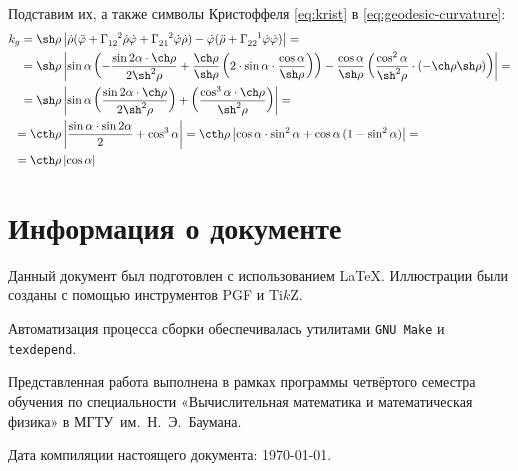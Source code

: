 \documentclass{article}
\numberwithin{equation}{section}
\renewcommand{\phi}{\varphi}
\newcommand{\krist}[3]{\Gamma^{\phantom{#1 #2}#3}_{#1 #2}}
\providecommand{\abs}[1]{\left \lvert{#1}\right \rvert}
\begin{document}
Подставим их, а также символы Кристоффеля \eqref{eq:krist} в
\eqref{eq:geodesic-curvature}:
\begin{equation*}\label{eq:con-geo-curvature}
  \begin{split}
    k_g = \sh\rho& \abs{\dot\rho(\ddot\phi +
      \krist{1}{2}{2}\dot\rho\dot\phi +
      \krist{2}{1}{2}\dot\phi\dot\rho) -
      \dot\phi(\ddot\rho + \krist{2}{2}{1}\dot\phi\dot\phi)} =\\
    =\sh\rho& \abs{\sin\alpha\left(-\frac{\sin{2\alpha} \cdot
          \ch\rho}{2\sh^2\rho} +
        \frac{\ch\rho}{\sh\rho}\left(2\cdot\sin\alpha\cdot\frac{\cos\alpha}{\sh\rho}\right)\right)
      - \frac{\cos\alpha}{\sh\rho}
      \left(\frac{\cos^2\alpha}{\sh^2\rho}\cdot\left(-\ch\rho
          \sh\rho\right)\right)} =\\
    =\sh\rho&
    \abs{\sin\alpha\left(\frac{\sin{2\alpha}\cdot\ch\rho}{2\sh^2\rho}\right)
      + \left(\frac{\cos^3\alpha\cdot\ch\rho}{\sh^2\rho}\right)} =\\
    =\cth\rho&\abs{\frac{\sin\alpha\cdot\sin{2\alpha}}{2}+\cos^3\alpha}
    = \cth\rho\abs{\cos\alpha\cdot\sin^2\alpha+\cos\alpha\,(1-\sin^2\alpha)} =\\
    = \cth\rho&\abs{\cos\alpha}    
  \end{split}
\end{equation*}

\clearpage
\appendix
\section{Информация о документе}

Данный документ был подготовлен с использованием \LaTeX{}. Иллюстрации
были созданы с помощью инструментов PGF и Ti$k$Z.

Автоматизация процесса сборки обеспечивалась утилитами
\texttt{GNU Make} и \texttt{texdepend}.

Представленная работа выполнена в рамках программы четвёртого семестра
обучения по специальности «Вычислительная математика и математическая
физика» в МГТУ им. Н. Э. Баумана.

Дата компиляции настоящего документа: \today.



\end{document}
